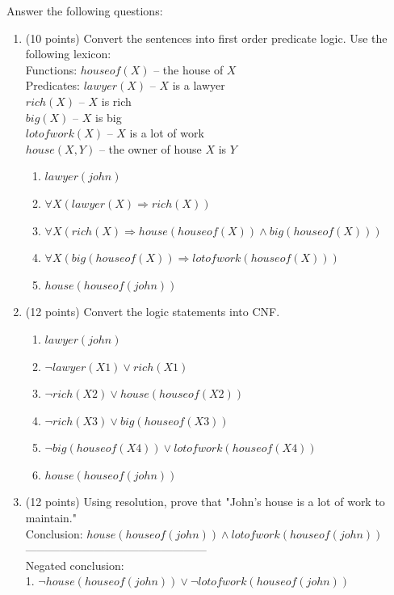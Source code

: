 \documentclass{article}%
\begin{document}
\begin{enumerate}
    Answer the following questions:
     \begin{enumerate}
	\item (10 points) Convert the sentences into first order predicate logic. Use the following lexicon: \\
	Functions: $houseof(X)$ -- the house of $X$ \\
	Predicates: $lawyer(X)$ -- $X$ is a lawyer\\
            $rich(X)$ -- $X$ is rich \\
            $big(X)$ -- $X$ is big \\
            $lotofwork(X)$ -- $X$ is a lot of work \\
            $house(X, Y)$ -- the owner of house $X$ is $ Y$\\
        \begin{enumerate}
		\item $ lawyer(john) $
		\item $ \forall X (lawyer(X) \Rightarrow rich(X)) $
		\item $ \forall X (rich(X) \Rightarrow house(houseof(X)) \wedge big(houseof(X)) ) $
		\item $ \forall X (big(houseof(X)) \Rightarrow lotofwork(houseof(X))) $
		\item $ house(houseof(john)) $
		\end{enumerate} 
    \item (12 points) Convert the logic statements into CNF.
    	\begin{enumerate}
		\item $ lawyer(john) $
		\item $ \neg lawyer(X1) \vee rich(X1) $
		\item $ \neg rich(X2) \vee house(houseof(X2)) $ 
		\item $ \neg rich(X3) \vee big(houseof(X3)) $
		\item $ \neg big(houseof(X4)) \vee lotofwork(houseof(X4)) $
		\item $ house(houseof(john)) $
		\end{enumerate}
	\item (12 points) Using resolution, prove that "John's house is a lot of work to maintain." \\
	Conclusion: $ house(houseof(john)) \wedge lotofwork(houseof(john))$\\
		------------------------------------------------\\
		Negated conclusion:  \\
		1. $ \neg house(houseof(john)) \vee \neg lotofwork(houseof(john))$ \\

\end{enumerate}
\end{enumerate}
\end{document}
